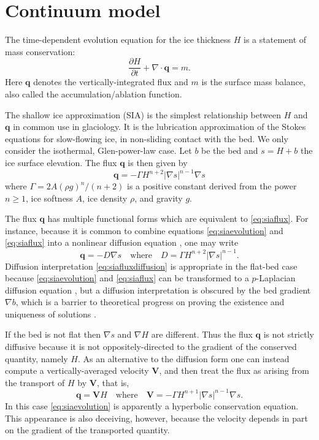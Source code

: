 \documentclass[twocolumn,letterpaper]{igs}
\newcommand\bq{\mathbf{q}}
\newcommand\bV{\mathbf{V}}
\newcommand{\Div}{\nabla\cdot}
\newcommand{\grad}{\nabla}
\begin{document}
\section*{Continuum model}

The time-dependent evolution equation for the ice thickness $H$ is a statement of mass conservation:
\begin{equation}
\frac{\partial H}{\partial t} + \Div \bq = m.  \label{eq:siaevolution}
\end{equation}
Here $\bq$ denotes the vertically-integrated flux and $m$ is the surface mass balance, also called the accumulation/ablation function.

The shallow ice approximation (SIA) is the simplest relationship between $H$ and $\bq$ in common use in glaciology.  It is the lubrication approximation \citep{Fowler1997} of the Stokes equations for slow-flowing ice, in non-sliding contact with the bed.  We only consider the isothermal, Glen-power-law \citep{GreveBlatter2009} case.  Let $b$ be the bed and $s = H+b$ the ice surface elevation.  The flux $\bq$ is then given by
\begin{equation}
\bq = - \Gamma H^{n+2} |\grad s|^{n-1} \grad s  \label{eq:siaflux}
\end{equation}
where $\Gamma = 2 A (\rho g)^n / (n+2)$ is a positive constant derived from the power $n\ge 1$, ice softness $A$, ice density $\rho$, and gravity $g$.

The flux $\bq$ has multiple functional forms which are equivalent to \eqref{eq:siaflux}.  For instance, because it is common to combine equations \eqref{eq:siaevolution} and \eqref{eq:siaflux} into a nonlinear diffusion equation \citep{Huybrechtsetal1996}, one may write
\begin{equation}
\bq = - D \grad s \quad \text{where} \quad D =  \Gamma H^{n+2} |\grad s|^{n-1}. \label{eq:siafluxdiffusion}
\end{equation}
Diffusion interpretation \eqref{eq:siafluxdiffusion} is appropriate in the flat-bed case because \eqref{eq:siaevolution} and \eqref{eq:siaflux} can be transformed to a $p$-Laplacian diffusion equation \citep{Calvoetal2002}, but a diffusion interpretation is obscured by the bed gradient $\grad b$, which is a barrier to theoretical progress on proving the existence and uniqueness of solutions \citep{JouvetBueler2012}.

If the bed is not flat then $\grad s$ and $\grad H$ are different.  Thus the flux $\bq$ is not strictly diffusive because it is not oppositely-directed to the gradient of the conserved quantity, namely $H$.  As an alternative to the diffusion form one can instead compute a vertically-averaged velocity $\bV$, and then treat the flux as arising from the transport of $H$ by $\bV$, that is,
\begin{equation}
\bq = \bV H \quad \text{where} \quad \bV = - \Gamma H^{n+1} |\grad s|^{n-1} \grad s. \label{eq:siafluxvelocity}
\end{equation}
In this case \eqref{eq:siaevolution} is apparently a hyperbolic conservation equation.  This appearance is also deceiving, however, because the velocity depends in part on the gradient of the transported quantity. 
\end{document}
